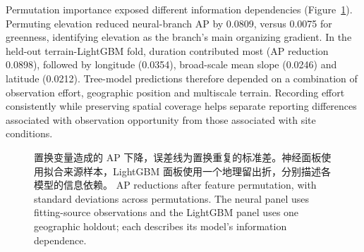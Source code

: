 \else
Permutation importance exposed different information dependencies (Figure~\ref{fig:imp}). Permuting elevation reduced neural-branch AP by 0.0809, versus 0.0075 for greenness, identifying elevation as the branch's main organizing gradient. In the held-out terrain-LightGBM fold, duration contributed most (AP reduction 0.0898), followed by longitude (0.0354), broad-scale mean slope (0.0246) and latitude (0.0212). Tree-model predictions therefore depended on a combination of observation effort, geographic position and multiscale terrain. Recording effort consistently while preserving spatial coverage helps separate reporting differences associated with observation opportunity from those associated with site conditions.
\fi
\begin{figure}[htbp]\centering{}
\caption{\ifzh
置换变量造成的 AP 下降，误差线为置换重复的标准差。神经面板使用拟合来源样本，LightGBM 面板使用一个地理留出折，分别描述各模型的信息依赖。
\else
AP reductions after feature permutation, with standard deviations across permutations. The neural panel uses fitting-source observations and the LightGBM panel uses one geographic holdout; each describes its model's information dependence.
\fi}\label{fig:imp}
\end{figure}
\FloatBarrier
